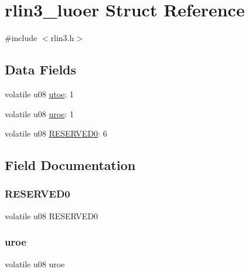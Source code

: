 \hypertarget{structrlin3__luoer}{}\section{rlin3\+\_\+luoer Struct Reference}
\label{structrlin3__luoer}


{\ttfamily \#include $<$rlin3.\+h$>$}

\subsection*{Data Fields}
\begin{DoxyCompactItemize}
\item 
volatile u08 \mbox{\hyperlink{structrlin3__luoer_ab76182824a36bc7613ff945d6d0b9e72}{utoe}}\+: 1
\item 
volatile u08 \mbox{\hyperlink{structrlin3__luoer_aa86db7268c6b644b71cfea99b404cd76}{uroe}}\+: 1
\item 
volatile u08 \mbox{\hyperlink{structrlin3__luoer_a59c0b30ccfb89f1b34e9682741859abd}{R\+E\+S\+E\+R\+V\+E\+D0}}\+: 6
\end{DoxyCompactItemize}


\subsection{Field Documentation}
\mbox{\label{structrlin3__luoer_a59c0b30ccfb89f1b34e9682741859abd}} 
\subsubsection{\texorpdfstring{R\+E\+S\+E\+R\+V\+E\+D0}{RESERVED0}}
{\footnotesize\ttfamily volatile u08 R\+E\+S\+E\+R\+V\+E\+D0}

\mbox{\label{structrlin3__luoer_aa86db7268c6b644b71cfea99b404cd76}} 
\subsubsection{\texorpdfstring{uroe}{uroe}}
{\footnotesize\ttfamily volatile u08 uroe}

